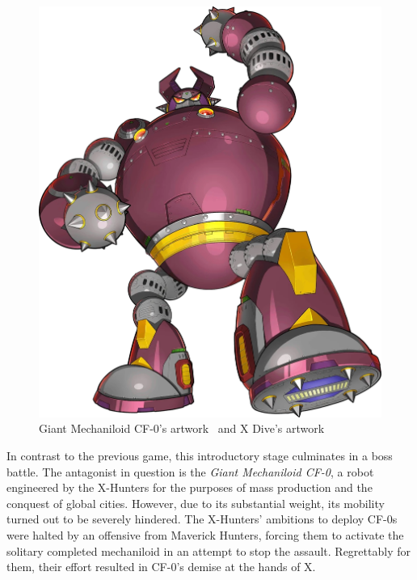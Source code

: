 \begin{figure}[htp]
	\includegraphics[height=\portraitsize]{figures/X2/Enemies/Gigantic_Mechaniloid_CF0.png}
	\caption{Giant Mechaniloid CF-0's artwork~\cite{book:MMX_Complete_art} and X Dive's artwork}
\end{figure}
In contrast to the previous game, this introductory stage culminates in a boss battle. The antagonist in question is the \emph{Giant Mechaniloid CF-0}, a robot engineered by the X-Hunters for the purposes of mass production and the conquest of global cities. However, due to its substantial weight, its mobility turned out to be severely hindered. The X-Hunters' ambitions to deploy CF-0s were halted by an offensive from Maverick Hunters, forcing them to activate the solitary completed mechaniloid in an attempt to stop the assault. Regrettably for them, their effort resulted in CF-0's demise at the hands of X.
